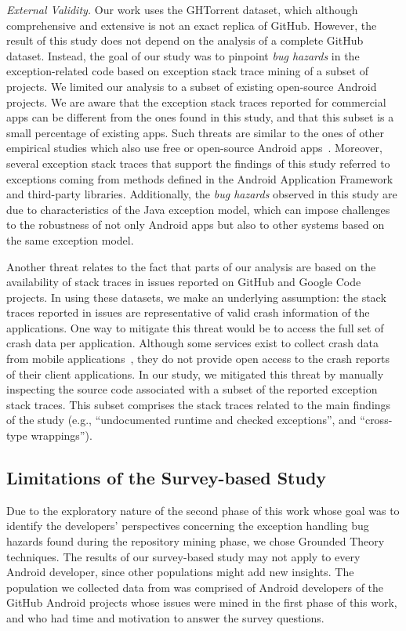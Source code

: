 \emph{External Validity.} Our work uses the GHTorrent dataset, which although 
comprehensive and extensive is not an exact replica of GitHub. 
However, the result of this study does not depend on the analysis of
a complete GitHub dataset. Instead, the goal of our study was to 
pinpoint \emph{bug hazards} in the exception-related code based on 
exception stack trace mining of a subset of projects.
We limited our analysis to a subset of existing open-source Android projects.
We are aware that the exception stack traces reported 
for commercial apps can be different from the ones found in this study, and that
this subset is a small percentage of existing apps.
Such threats are similar to the ones of other empirical studies 
which also use free or open-source Android apps~\cite{Linar13,McDon13,Ruiz12}.
Moreover, several exception stack traces that support the findings of this study
referred to exceptions coming from methods defined in the Android Application Framework
and third-party libraries.  Additionally,  the \emph{bug hazards} observed in this study are due to
characteristics of the Java exception model, which can impose challenges to 
the robustness of not only Android apps but also to other systems
 based on the same exception model. 

Another threat relates to the fact that parts of our analysis 
are based on the availability of stack traces in issues reported on GitHub and Google Code projects. 
In using these datasets, we make an underlying assumption: the stack traces reported in issues are 
representative of valid crash information of the applications. 
One way to mitigate this threat would be to access the full 
set of crash data per application. Although some services exist 
to collect crash data from mobile applications~\cite{BugSe14,BugSn14,Googl14,Acra14},
they do not provide open access to the crash reports of their client applications.
In our study, we mitigated this threat by manually inspecting
the source code associated with a subset of the reported exception stack traces.
This subset comprises the stack traces related to the main findings 
of the study (e.g., ``undocumented runtime and checked exceptions'',
and ``cross-type wrappings'').

\subsection{Limitations of the Survey-based Study}
Due to the exploratory nature of the second phase of this work whose 
goal was to identify the developers' perspectives concerning the exception 
handling bug hazards found during the repository mining 
phase, we chose Grounded Theory techniques. The results of our
survey-based study may not apply to every Android developer, since other populations 
might add new insights.  The population we collected data from was comprised 
of Android developers of the GitHub 
Android projects whose issues were mined in the first phase of this work, and who had
time and motivation to answer the survey questions.

